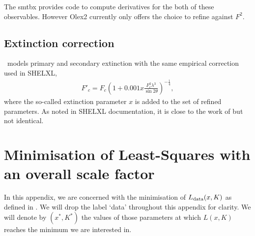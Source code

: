 \documentclass[pdf]{iucr}
\begin{document}
The smtbx provides code to compute derivatives for the both of these observables. However Olex2 currently only offers the choice to refine against $F^2$.

\subsection{Extinction correction}
\olexrefine\ models primary and secondary extinction with the same empirical correction used in SHELXL,
\begin{align}
F'_c = F_c\left(1+0.001 x \frac{F_c^{2}\lambda^3}{\sin 2\theta}\right)^{-\frac{1}{4}},
\end{align}
where the so-called extinction parameter $x$ is added to the set of refined parameters. As noted in SHELXL documentation, it is close to the work of  but not identical.


\section{Minimisation of Least-Squares with an overall scale factor}
\label{appendix:leastsquaresminimisation}
In this appendix, we are concerned with the minimisation of $L_{\text{data}}(x, K)$ as defined in . We will drop the label `data' throughout this appendix for clarity. We will denote by $(x^*, K^*)$ the values of those parameters at which $L(x,K)$ reaches the minimum we are interested in.
\end{document}
